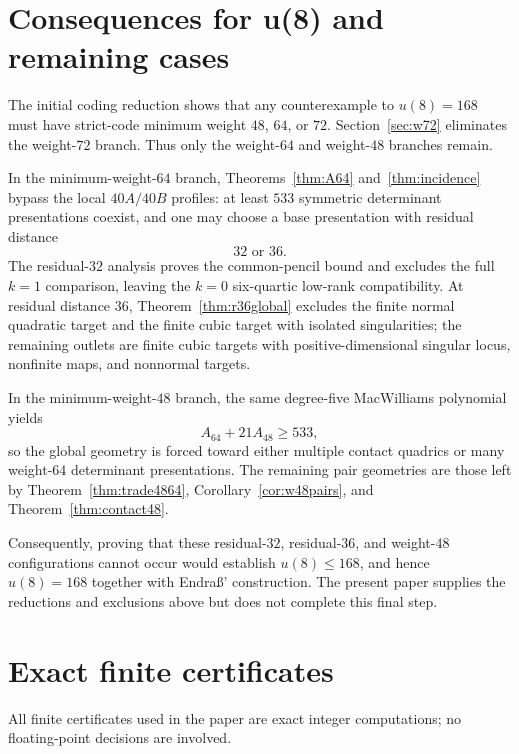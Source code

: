 \documentclass[11pt,reqno]{amsart}
\theoremstyle{remark}
\begin{document}
\section{Consequences for u(8) and remaining cases}\label{sec:open}
The initial coding reduction shows that any counterexample to $u(8)=168$ must have strict-code minimum weight $48$, $64$, or $72$.  Section~\ref{sec:w72} eliminates the weight-$72$ branch.  Thus only the weight-$64$ and weight-$48$ branches remain.

In the minimum-weight-$64$ branch, Theorems~\ref{thm:A64} and~\ref{thm:incidence} bypass the local $40A/40B$ profiles: at least $533$ symmetric determinant presentations coexist, and one may choose a base presentation with residual distance
\[
\boxed{32\text{ or }36}.
\]
The residual-$32$ analysis proves the common-pencil bound and excludes the full $k=1$ comparison, leaving the $k=0$ six-quartic low-rank compatibility.  At residual distance $36$, Theorem~\ref{thm:r36global} excludes the finite normal quadratic target and the finite cubic target with isolated singularities; the remaining outlets are finite cubic targets with positive-dimensional singular locus, nonfinite maps, and nonnormal targets.

In the minimum-weight-$48$ branch, the same degree-five MacWilliams polynomial yields
\[
A_{64}+21A_{48}\ge533,
\]
so the global geometry is forced toward either multiple contact quadrics or many weight-$64$ determinant presentations.  The remaining pair geometries are those left by Theorem~\ref{thm:trade4864}, Corollary~\ref{cor:w48pairs}, and Theorem~\ref{thm:contact48}.

Consequently, proving that these residual-$32$, residual-$36$, and weight-$48$ configurations cannot occur would establish $u(8)\le168$, and hence $u(8)=168$ together with Endra\ss' construction.  The present paper supplies the reductions and exclusions above but does not complete this final step.

\appendix
\section{Exact finite certificates}\label{app:cert}
All finite certificates used in the paper are exact integer computations; no floating-point decisions are involved.
\end{document}

